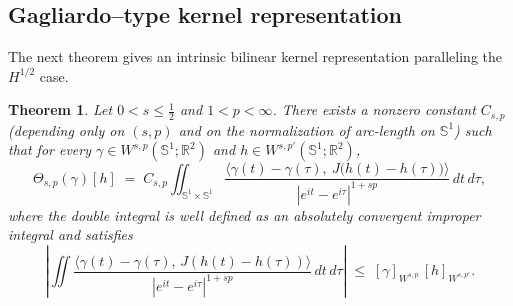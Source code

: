 \documentclass{amsart}
\newcounter{thm}
\newcounter{ex}
\newcounter{re}
\newtheorem{theorem}[thm]{Theorem}
\begin{document}
\subsection{Gagliardo–type kernel representation}
The next theorem gives an intrinsic bilinear kernel representation paralleling the
$H^{1/2}$ case.

\begin{theorem}\label{th:Theta-sp-kernel}
Let $0<s\le \tfrac12$ and $1<p<\infty$. There exists a nonzero constant
$C_{s,p}$ (depending only on $(s,p)$ and on the normalization of arc-length on $\mathbb S^1$) such that
for every $\gamma\in W^{s,p}(\mathbb S^1;\mathbb R^2)$ and $h\in W^{s,p'}(\mathbb S^1;\mathbb R^2)$,
\begin{equation}\label{eq:Theta-sp-kernel}
\Theta_{s,p}(\gamma)[h]
\;=\; C_{s,p}\iint_{\mathbb S^1\times\mathbb S^1}
\frac{\big\langle \gamma(t)-\gamma(\tau),\ J\big(h(t)-h(\tau)\big)\big\rangle}{|e^{it}-e^{i\tau}|^{1+sp}}
\,dt\,d\tau ,
\end{equation}
where the double integral is well defined as an absolutely convergent improper
integral and satisfies
\begin{equation}\label{eq:Theta-sp-kernel-bound}
\left|\iint \frac{\langle \gamma(t)-\gamma(\tau),\,J(h(t)-h(\tau))\rangle}
{|e^{it}-e^{i\tau}|^{1+sp}}\,dt\,d\tau\right|
\;\le\; [\gamma]_{W^{s,p}}\,[h]_{W^{s,p'}} .
\end{equation}
\end{theorem}
\end{document}
